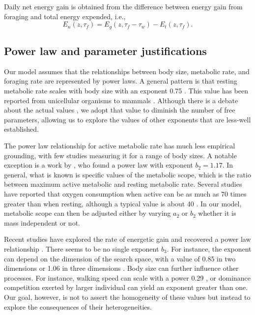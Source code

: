 Daily net energy gain is obtained from the  difference between energy gain from foraging and total energy expended, i.e.,
\[ 
	E_n(z, \tau_f) = E_g(z,\tau_f- \tau_w) - E_t(z, \tau_f).
\]

\subsection*{Power law and parameter justifications}
Our model assumes that the relationships between body size, metabolic rate, and foraging rate are represented by power laws.
A general pattern is that resting metabolic rate scales with body size with an exponent 0.75 \citep{Kleiber1947, Peters1986,Gillooly2001}.
This value has been reported from unicellular organisms to mammals \citep{Brown2004}.  %
Although there is a debate about the actual values \citep[e.g.,][]{Isaac2010}, we adopt that value to diminish the number of free parameters, allowing us to explore the values of other exponents that are less-well established.

The power law relationship for active metabolic rate has much less empirical grounding, with few studies measuring it for a range of body sizes.
A notable exception is a work by \citet{Bartholomew1978}, who found a power law with exponent $b_2 = 1.17$.
In general, what is known is specific values of the metabolic scope, which is the ratio between maximum active metabolic and resting metabolic rate.
Several studies have reported that oxygen consumption when active can be as much as 70 times greater than when resting, although a typical value is about 40 \citep{Bartholomew1981}.  
In our model, metabolic scope can then be adjusted either by varying $a_2$  or $b_2$ whether it is mass independent or not. %

Recent studies have explored the rate of energetic gain and recovered a power law relationship \citep{Pawar2012, Maino2015}.
There seems to be no single exponent $b_3$.
For instance, the exponent can depend on the dimension of the search space, with a value of 0.85 in two dimensions or 1.06 in three dimensions \citep{Pawar2012}.
Body size can further influence other processes.
For instance, walking speed  can scale with a power 0.29 \citep{Peters1986}, or dominance competition exerted by larger individual can yield an exponent greater than one.  %
Our goal, however, is not to assert the homogeneity of these values but instead to explore the consequences of their heterogeneities.

